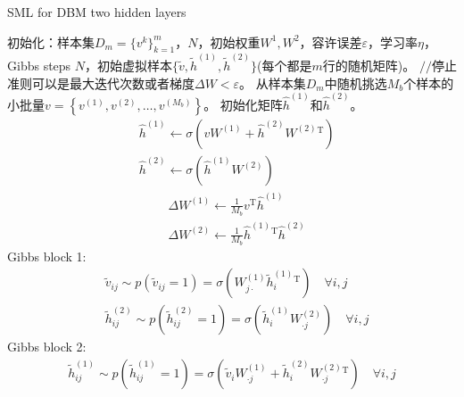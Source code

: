         \begin{algorithm}[htbp]
            \caption{SML for DBM two hidden layers}\label{code:SML}
            \begin{algorithmic}[1]
                \State 初始化：样本集$D_m = \{v^k\}_{k=1}^m$，$N$，初始权重$W^1,W^2$，容许误差$\varepsilon$，学习率$\eta$，Gibbs steps $N$，初始虚拟样本$\{\tilde{v},\tilde{h}^{(1)},\tilde{h}^{(2)}\}$(每个都是$m$行的随机矩阵)。
                    \State $//$停止准则可以是最大迭代次数或者梯度$\Delta W < \varepsilon$。
                    \State 从样本集$D_m$中随机挑选$M_b$个样本的小批量$v = \left\{v^{(1)},v^{(2)},\dots,v^{(M_b)}\right\}$。
                    \State 初始化矩阵$\hat{h}^{(1)}$和$\hat{h}^{(2)}$。
                        \begin{align*}
                        & \hat{h}^{(1)} \leftarrow \sigma \left( vW^{(1)}+\hat{h}^{(2)}W^{(2)}{}^\mathrm{T} \right) \\
                        & \hat{h}^{(2)} \leftarrow \sigma \left( \hat{h}^{(1)}W^{(2)} \right)
                        \end{align*}
                    \EndWhile
                    \begin{align*}
                    & \Delta W^{(1)} \leftarrow \frac{1}{M_b} v^\mathrm{T} \hat{h}^{(1)}  \\
                    & \Delta W^{(2)} \leftarrow \frac{1}{M_b} \hat{h}^{(1)}{}^\mathrm{T} \hat{h}^{(2)}
                    \end{align*}
                        \State Gibbs block 1:
                        \begin{align*}
                        & \tilde{v}_{ij} \sim p(\tilde{v}_{ij} = 1 ) = \sigma \left( W_{j\cdot}^{(1)} \tilde{ h}_i^{(1)}{}^\mathrm{T} \right)  \quad \forall i,j \\
                        & \tilde{h}_{ij}^{(2)} \sim p(\tilde{h}_{ij}^{(2)} = 1 ) = \sigma \left( \tilde{ h}_i^{(1)} W_{\cdot j}^{(2)} \right)  \quad \forall i,j
                        \end{align*}
                        \State Gibbs block 2:
                        \begin{align*}
                        \tilde{h}_{ij}^{(1)} \sim p(\tilde{h}_{ij}^{(1)} = 1 ) = \sigma \left( \tilde{v}_i W_{\cdot j}^{(1)} + \tilde{ h}_i^{(2)} W_{\cdot j}^{(2)}{}^\mathrm{T} \right)  \quad \forall i,j

\end{align*}
\end{algorithmic}
\end{algorithm}
